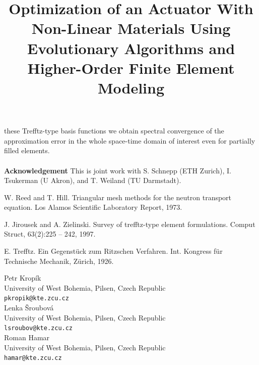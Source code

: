 \documentclass[article,A4,11pt]{llncs}%
\begin{document}
these Trefftz-type basis functions we obtain spectral convergence of the approximation error in the whole space-time domain of interest even for partially filled elements. \\\\

\textbf{Acknowledgement} This is joint work with S. Schnepp (ETH Zurich), I. Tsukerman (U Akron), and T. Weiland (TU Darmstadt).




\begin{thebibliography}{10}
{\sc W. Reed and T. Hill}. {Triangular mesh methods for the neutron transport equation}. Los Alamos Scientific Laboratory Report, 1973.

{\sc J. Jirousek and A. Zielinski}. {Survey of trefftz-type element formulations}. Comput Struct, 63(2):225 -- 242, 1997.

{\sc E. Trefftz}. {Ein Gegenst\"uck zum Ritzschen Verfahren}. Int. Kongress f\"ur Technische Mechanik, Z\"urich, 1926.
\end{thebibliography}

\title{Optimization of an Actuator With Non-Linear Materials Using Evolutionary Algorithms and Higher-Order Finite Element Modeling}
 \author{} \institute{}
\maketitle
\begin{center}
{\large Petr Krop\'{i}k}\\
University of West Bohemia, Pilsen, Czech Republic\\
{\tt pkropik@kte.zcu.cz}
\\ \vspace{4mm}
{\large Lenka \v{S}roubov\'{a}}\\
University of West Bohemia, Pilsen, Czech Republic\\
{\tt lsroubov@kte.zcu.cz}
\\ \vspace{4mm}
{\large Roman Hamar}\\
University of West Bohemia, Pilsen, Czech Republic\\
{\tt hamar@kte.zcu.cz}
\end{center}
\end{document}
